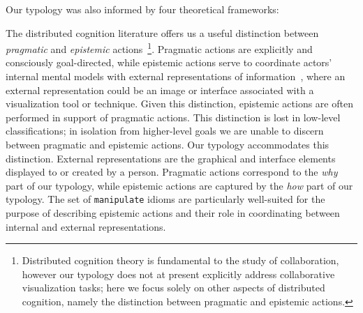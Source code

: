 
Our typology was also informed by four theoretical frameworks:

The distributed cognition literature offers us a useful distinction between {\it pragmatic} and {\it epistemic} actions~\cite{Kirsh1994,Liu2008}\footnote{\label{DCfootnote}Distributed cognition theory is fundamental to the study of collaboration, however our typology does not at present explicitly address collaborative visualization tasks; here we focus solely on other aspects of distributed cognition, namely the distinction between pragmatic and epistemic actions.}.
Pragmatic actions are explicitly and consciously goal-directed, while epistemic actions serve to coordinate actors' internal mental models with external representations of information~\cite{Liu2008}, where an external representation could be an image or interface associated with a visualization tool or technique.
Given this distinction, epistemic actions are often performed in support of pragmatic actions.
This distinction is lost in low-level classifications; in isolation from higher-level goals we are unable to discern between pragmatic and epistemic actions.
Our typology accommodates this distinction.
External representations are the graphical and interface elements displayed to or created by a person.
Pragmatic actions correspond to the {\it why} part of our typology, while epistemic actions are captured by the {\it how} part of our typology.
The set of {\tt manipulate} idioms are particularly well-suited for the purpose of describing epistemic actions and their role in coordinating between internal and external representations.

